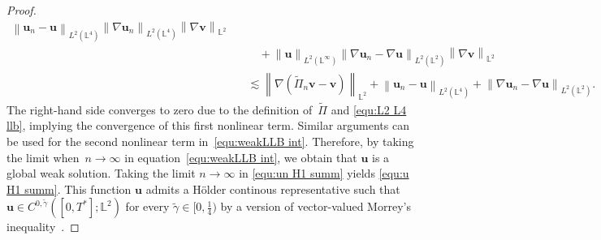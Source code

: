 \documentclass[11pt,reqno]{amsart}
\theoremstyle{definition}
\numberwithin{equation}{section}
\newcommand{\bff}{\boldsymbol}
\newcommand{\bb}{\mathbb}
\newcommand{\norm}[2]{\left\|{#1}\right\|_{#2}}
\begin{document}
\begin{proof}
\begin{align*}
		\norm{\bff{u}_n-\bff{u}}{L^2(\bb{L}^4)}
		\norm{\nabla\bff{u}_n}{L^2(\bb{L}^4)}
		\norm{\nabla\bff{v}}{\bb{L}^2}
		\\
		&\qquad
		+
		\norm{\bff{u}}{L^2(\bb{L}^\infty)}
		\norm{\nabla \bff{u}_n- \nabla \bff{u}}{L^2(\bb{L}^2)}
		\norm{\nabla\bff{v}}{\bb{L}^2}
		\\
		&\quad\lesssim
		\norm{\nabla(\tilde\Pi_n\bff{v}-\bff{v})}{\bb{L}^2}
		+
		\norm{\bff{u}_n-\bff{u}}{L^2(\bb{L}^4)}
		+
		\norm{\nabla \bff{u}_n- \nabla \bff{u}}{L^2(\bb{L}^2)}.
	\end{align*}
	The right-hand side converges to zero due to the definition 
	of~$\tilde\Pi$ and \eqref{equ:L2 L4 llb}, implying the convergence of this first
	nonlinear term. Similar arguments can be used for the second nonlinear term
	in~\eqref{equ:weakLLB int}.  Therefore, by taking the limit when~$n\to\infty$ in
	equation~\eqref{equ:weakLLB int}, we obtain that
	$\bff{u}$ is a global weak solution. Taking the limit $n\to\infty$ in \eqref{equ:un H1 summ} yields \eqref{equ:u H1 summ}. This function $\bff{u}$ admits a H\"older continous representative such that $\bff{u}\in C^{0,\widetilde{\gamma}}([0,T^\ast];\bb{L}^2)$ for every $\widetilde{\gamma}\in [0,\frac14)$ by a version of vector-valued Morrey's inequality~\citep{AreKre18}.
	

\end{proof}
\end{document}
